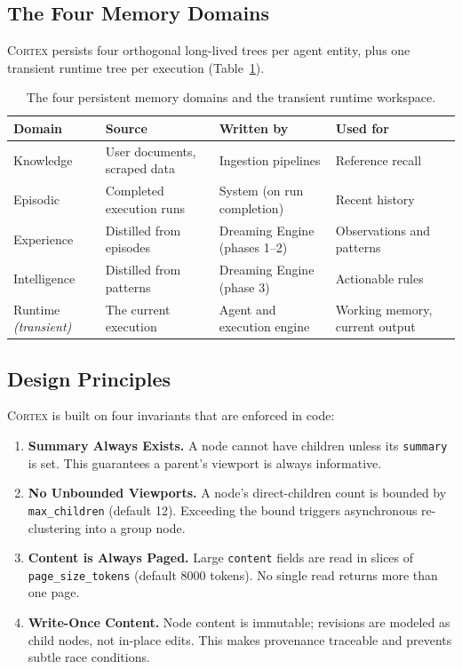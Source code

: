 \documentclass[11pt,a4paper]{article}
\theoremstyle{cortexprop}
\newcommand{\code}[1]{\texttt{#1}}
\begin{document}
\subsection{The Four Memory Domains}

\textsc{Cortex} persists four orthogonal long-lived trees per agent entity,
plus one transient runtime tree per execution
(Table~\ref{tab:domains}).

\begin{table}[h]
\centering
\caption{The four persistent memory domains and the transient runtime
workspace.}
\label{tab:domains}
\small
\begin{tabularx}{\linewidth}{lXXX}
\toprule
\textbf{Domain} & \textbf{Source} & \textbf{Written by} & \textbf{Used for}\\
\midrule
Knowledge & User documents, scraped data & Ingestion pipelines & Reference recall \\
Episodic & Completed execution runs & System (on run completion) & Recent history \\
Experience & Distilled from episodes & Dreaming Engine (phases 1--2) & Observations and patterns \\
Intelligence & Distilled from patterns & Dreaming Engine (phase 3) & Actionable rules \\
\midrule
Runtime \textit{(transient)} & The current execution & Agent and execution engine & Working memory, current output \\
\bottomrule
\end{tabularx}
\end{table}

\subsection{Design Principles}

\textsc{Cortex} is built on four invariants that are enforced in code:

\begin{enumerate}
  \item \textbf{Summary Always Exists.} A node cannot have children unless
  its \code{summary} is set. This guarantees a parent's viewport is always
  informative.
  \item \textbf{No Unbounded Viewports.} A node's direct-children count is
  bounded by \code{max\_children} (default 12). Exceeding the bound triggers
  asynchronous re-clustering into a group node.
  \item \textbf{Content is Always Paged.} Large \code{content} fields are
  read in slices of \code{page\_size\_tokens} (default 8000 tokens). No
  single read returns more than one page.
  \item \textbf{Write-Once Content.} Node content is immutable; revisions
  are modeled as child nodes, not in-place edits. This makes provenance
  traceable and prevents subtle race conditions.
\end{enumerate}
\end{document}

